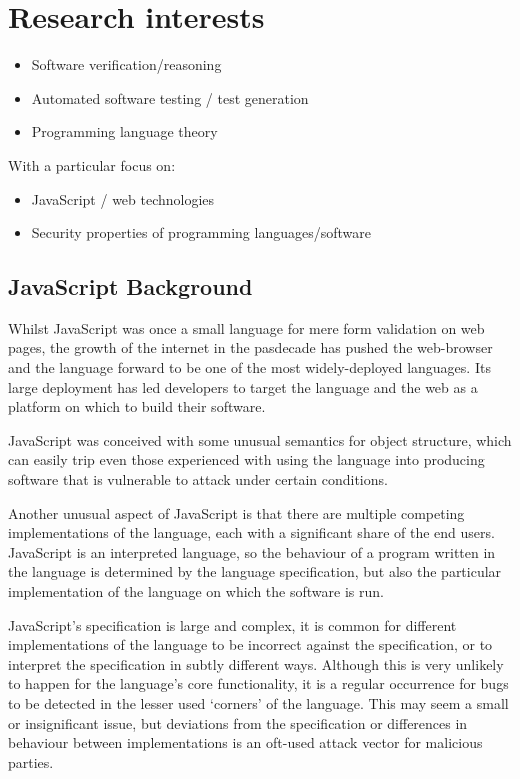 \documentclass[a4paper]{article}
\begin{document}
\section{Research interests}
\begin{itemize}
\item Software verification/reasoning
\item Automated software testing / test generation
\item Programming language theory
\end{itemize}
With a particular focus on:
\begin{itemize}
\item JavaScript / web technologies
\item Security properties of programming languages/software
\end{itemize}

\subsection{JavaScript Background}
Whilst JavaScript was once a small language for mere form validation on web
pages, the growth of the internet in the pasdecade has pushed the web-browser
and the language forward to be one of the most widely-deployed languages.
Its large deployment has led developers to target the language and the web as a
platform on which to build their software. %

JavaScript was conceived with some unusual semantics for object structure, which
can easily trip even those experienced with
using the language into producing software that is vulnerable to attack under
certain conditions.

Another unusual aspect of JavaScript is that there are multiple competing
implementations of the language, each with a significant share of the end users.
JavaScript is an interpreted language, so the behaviour of a program written in
the language is determined by the language specification, but also
the particular implementation of the language on which the software is
run.

JavaScript's specification is large and complex, it is common for
different implementations of the language to be incorrect against the
specification, or to interpret the specification in subtly different ways.
Although this is very unlikely to happen for the language's core functionality,
it is a regular occurrence for bugs to be detected in the lesser used `corners'
of the language. This may seem a small or insignificant issue, but
deviations from the specification or differences in behaviour between
implementations is an oft-used attack vector for malicious parties.
\end{document}
